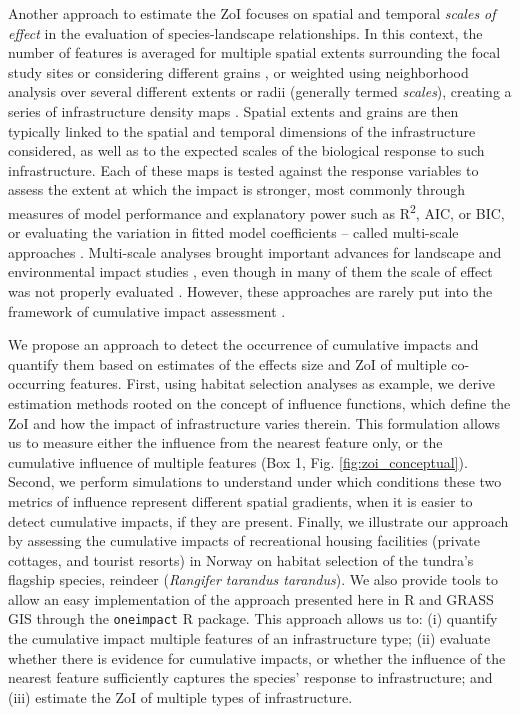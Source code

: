 \documentclass[titlepage]{article}
\begin{document}
Another approach to estimate the ZoI focuses on spatial and temporal \textit{scales of effect} in the evaluation of species-landscape relationships. In this context, the number of features is averaged for multiple spatial extents surrounding the focal study sites \citep{jackson_are_2015} or considering different grains \citep{laforge_process-focussed_2015}, or weighted using neighborhood analysis over several different extents or radii (generally termed \textit{scales}), creating a series of infrastructure density maps \citep{mcgarigal_multi-scale_2016}. Spatial extents and grains are then typically linked to the spatial and temporal dimensions of the infrastructure considered, as well as to the expected scales of the biological response to such infrastructure. Each of these maps is tested against the response variables to assess the extent at which the impact is stronger, most commonly through measures of model performance and explanatory power such as R\textsuperscript{2}, AIC, or BIC, or evaluating the variation in fitted model coefficients \citep{jackson_are_2015, huais_multifit_2018} -- called multi-scale approaches \citep[e.g.][]{zeller_multi-level_2017}.
Multi-scale analyses brought important advances for landscape and environmental impact studies \citep[e.g.][]{mcgarigal_multi-scale_2016}, even though in many of them the scale of effect was not properly evaluated \citep{jackson_are_2015}. However, these approaches are rarely put into the framework of cumulative impact assessment \citep[but see][]{polfus_identifying_2011}.

We propose an approach to detect the occurrence of cumulative impacts and quantify them based on estimates of the effects size and ZoI of multiple co-occurring features. First, using habitat selection analyses as example, we derive estimation methods rooted on the concept of influence functions, which define the ZoI and how the impact of infrastructure varies therein. This formulation allows us to measure either the influence from the nearest feature only, or the cumulative influence of multiple features (Box 1, Fig. \ref{fig:zoi_conceptual}). Second, we perform simulations to understand under which conditions these two metrics of influence represent different spatial gradients, when it is easier to detect cumulative impacts, if they are present. 
Finally, we illustrate our approach by assessing the cumulative impacts of recreational housing facilities (private cottages, and tourist resorts) in Norway on habitat selection of the tundra's flagship species, reindeer (\textit{Rangifer tarandus tarandus}). We also provide tools to allow an easy implementation of the approach presented here in R \citep{r_core_team_r_2020} and GRASS GIS \citep{grass_development_team_geographic_2017} through the \verb|oneimpact| R package. This approach allows us to: (i) quantify the cumulative impact multiple features of an infrastructure type; (ii) evaluate whether there is evidence for cumulative impacts, or whether the influence of the nearest feature sufficiently captures the species' response to infrastructure; and (iii) estimate the ZoI of multiple types of infrastructure. 
\end{document}
